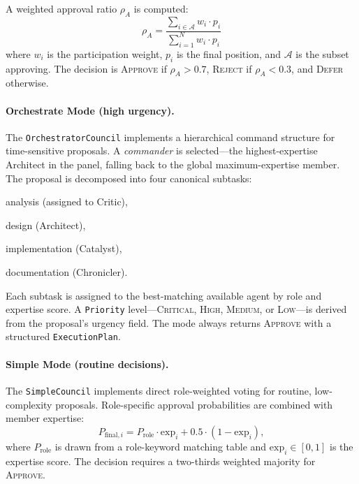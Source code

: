 \documentclass[11pt]{article}
\begin{document}
A weighted approval ratio $\rho_A$ is computed:
\begin{equation}
  \rho_A = \frac{\sum_{i \in \mathcal{A}} w_i \cdot p_i}
                {\sum_{i=1}^{N} w_i \cdot p_i}
\end{equation}
where $w_i$ is the participation weight, $p_i$ is the final position, and
$\mathcal{A}$ is the subset approving. The decision is \textsc{Approve} if
$\rho_A > 0.7$, \textsc{Reject} if $\rho_A < 0.3$, and \textsc{Defer} otherwise.

\paragraph{Orchestrate Mode (high urgency).}
The \texttt{OrchestratorCouncil} implements a hierarchical command structure for
time-sensitive proposals. A \emph{commander} is selected---the highest-expertise
Architect in the panel, falling back to the global maximum-expertise member. The
proposal is decomposed into four canonical subtasks:
\begin{enumerate*}[label=(\roman*)]
  \item analysis (assigned to Critic),
  \item design (Architect),
  \item implementation (Catalyst),
  \item documentation (Chronicler).
\end{enumerate*}
Each subtask is assigned to the best-matching available agent by role and
expertise score. A \texttt{Priority} level---\textsc{Critical}, \textsc{High},
\textsc{Medium}, or \textsc{Low}---is derived from the proposal's urgency field.
The mode always returns \textsc{Approve} with a structured \texttt{ExecutionPlan}.

\paragraph{Simple Mode (routine decisions).}
The \texttt{SimpleCouncil} implements direct role-weighted voting for routine,
low-complexity proposals. Role-specific approval probabilities are combined with
member expertise:
\begin{equation}
  P_{\text{final},i} = P_{\text{role}} \cdot \text{exp}_i
                       + 0.5 \cdot (1 - \text{exp}_i),
  \label{eq:simple_vote}
\end{equation}
where $P_{\text{role}}$ is drawn from a role-keyword matching table and
$\text{exp}_i \in [0,1]$ is the expertise score. The decision requires a
two-thirds weighted majority for \textsc{Approve}.
\end{document}
